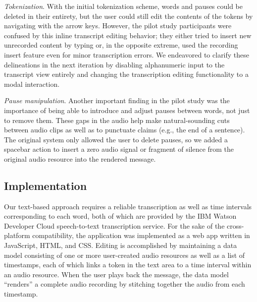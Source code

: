 \emph{Tokenization}. 
With the initial tokenization scheme, words and pauses could be deleted in their entirety, but the user could still edit the contents of the tokens by navigating with the arrow keys.
However, the pilot study participants were confused by this inline transcript editing behavior; they either tried to insert new unrecorded content by typing or, in the opposite extreme, used the recording insert feature even for minor transcription errors. 
We endeavored to clarify these delineations in the next iteration by disabling alphanumeric input to the transcript view entirely and changing the transcription editing functionality to a modal interaction.

\emph{Pause manipulation}.
Another important finding in the pilot study was the importance of being able to introduce and adjust pauses between words, not just to remove them. 
These gaps in the audio help make natural-sounding cuts between audio clips as well as to punctuate claims (e.g., the end of a sentence). 
The original system only allowed the user to delete pauses, so we added a spacebar action to insert a zero audio signal or fragment of silence from the original audio resource into the rendered message. 

\subsection{Implementation}
Our text-based approach requires a reliable transcription as well as time intervals corresponding to each word, both of which are provided by the IBM Watson Developer Cloud speech-to-text transcription service.
For the sake of the cross-platform compatibility, the application was implemented as a web app written in JavaScript, HTML, and CSS.
Editing is accomplished by maintaining a data model consisting of one or more user-created audio resources as well as a list of timestamps, each of which links a token in the text area to a time interval within an audio resource. 
When the user plays back the message, the data model ``renders'' a complete audio recording by stitching together the audio from each timestamp. 
